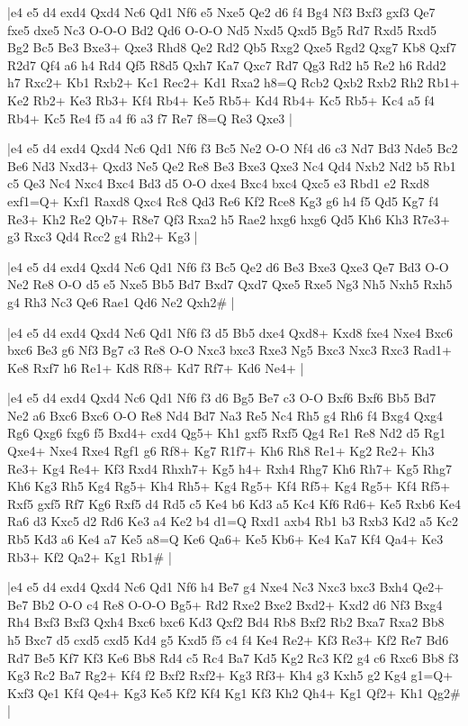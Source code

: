 \whitename{}
\blackname{}
\makegametitle
|e4 e5 d4 exd4 Qxd4 Nc6 Qd1 Nf6 e5 Nxe5 Qe2 d6 f4 Bg4 Nf3 Bxf3 gxf3 Qe7 fxe5 dxe5 Nc3 O-O-O Bd2 Qd6 O-O-O Nd5 Nxd5 Qxd5 Bg5 Rd7 Rxd5 Rxd5 Bg2 Bc5 Be3 Bxe3+ Qxe3 Rhd8 Qe2 Rd2 Qb5 Rxg2 Qxe5 Rgd2 Qxg7 Kb8 Qxf7 R2d7 Qf4 a6 h4 Rd4 Qf5 R8d5 Qxh7 Ka7 Qxc7 Rd7 Qg3 Rd2 h5 Re2 h6 Rdd2 h7 Rxc2+ Kb1 Rxb2+ Kc1 Rec2+ Kd1 Rxa2 h8=Q Rcb2 Qxb2 Rxb2 Rh2 Rb1+ Ke2 Rb2+ Ke3 Rb3+ Kf4 Rb4+ Ke5 Rb5+ Kd4 Rb4+ Kc5 Rb5+ Kc4 a5 f4 Rb4+ Kc5 Re4 f5 a4 f6 a3 f7 Re7 f8=Q Re3 Qxe3  |

\whitename{}
\blackname{}
\makegametitle
|e4 e5 d4 exd4 Qxd4 Nc6 Qd1 Nf6 f3 Bc5 Ne2 O-O Nf4 d6 c3 Nd7 Bd3 Nde5 Bc2 Be6 Nd3 Nxd3+ Qxd3 Ne5 Qe2 Re8 Be3 Bxe3 Qxe3 Nc4 Qd4 Nxb2 Nd2 b5 Rb1 c5 Qe3 Nc4 Nxc4 Bxc4 Bd3 d5 O-O dxe4 Bxc4 bxc4 Qxc5 e3 Rbd1 e2 Rxd8 exf1=Q+ Kxf1 Raxd8 Qxc4 Rc8 Qd3 Re6 Kf2 Rce8 Kg3 g6 h4 f5 Qd5 Kg7 f4 Re3+ Kh2 Re2 Qb7+ R8e7 Qf3 Rxa2 h5 Rae2 hxg6 hxg6 Qd5 Kh6 Kh3 R7e3+ g3 Rxc3 Qd4 Rcc2 g4 Rh2+ Kg3  |

\whitename{}
\blackname{}
\makegametitle
|e4 e5 d4 exd4 Qxd4 Nc6 Qd1 Nf6 f3 Bc5 Qe2 d6 Be3 Bxe3 Qxe3 Qe7 Bd3 O-O Ne2 Re8 O-O d5 e5 Nxe5 Bb5 Bd7 Bxd7 Qxd7 Qxe5 Rxe5 Ng3 Nh5 Nxh5 Rxh5 g4 Rh3 Nc3 Qe6 Rae1 Qd6 Ne2 Qxh2\#  |

\whitename{}
\blackname{}
\makegametitle
|e4 e5 d4 exd4 Qxd4 Nc6 Qd1 Nf6 f3 d5 Bb5 dxe4 Qxd8+ Kxd8 fxe4 Nxe4 Bxc6 bxc6 Be3 g6 Nf3 Bg7 c3 Re8 O-O Nxc3 bxc3 Rxe3 Ng5 Bxc3 Nxc3 Rxc3 Rad1+ Ke8 Rxf7 h6 Re1+ Kd8 Rf8+ Kd7 Rf7+ Kd6 Ne4+  |

\whitename{}
\blackname{}
\makegametitle
|e4 e5 d4 exd4 Qxd4 Nc6 Qd1 Nf6 f3 d6 Bg5 Be7 c3 O-O Bxf6 Bxf6 Bb5 Bd7 Ne2 a6 Bxc6 Bxc6 O-O Re8 Nd4 Bd7 Na3 Re5 Nc4 Rh5 g4 Rh6 f4 Bxg4 Qxg4 Rg6 Qxg6 fxg6 f5 Bxd4+ cxd4 Qg5+ Kh1 gxf5 Rxf5 Qg4 Re1 Re8 Nd2 d5 Rg1 Qxe4+ Nxe4 Rxe4 Rgf1 g6 Rf8+ Kg7 R1f7+ Kh6 Rh8 Re1+ Kg2 Re2+ Kh3 Re3+ Kg4 Re4+ Kf3 Rxd4 Rhxh7+ Kg5 h4+ Rxh4 Rhg7 Kh6 Rh7+ Kg5 Rhg7 Kh6 Kg3 Rh5 Kg4 Rg5+ Kh4 Rh5+ Kg4 Rg5+ Kf4 Rf5+ Kg4 Rg5+ Kf4 Rf5+ Rxf5 gxf5 Rf7 Kg6 Rxf5 d4 Rd5 c5 Ke4 b6 Kd3 a5 Kc4 Kf6 Rd6+ Ke5 Rxb6 Ke4 Ra6 d3 Kxc5 d2 Rd6 Ke3 a4 Ke2 b4 d1=Q Rxd1 axb4 Rb1 b3 Rxb3 Kd2 a5 Kc2 Rb5 Kd3 a6 Ke4 a7 Ke5 a8=Q Ke6 Qa6+ Ke5 Kb6+ Ke4 Ka7 Kf4 Qa4+ Ke3 Rb3+ Kf2 Qa2+ Kg1 Rb1\#  |

\whitename{}
\blackname{}
\makegametitle
|e4 e5 d4 exd4 Qxd4 Nc6 Qd1 Nf6 h4 Be7 g4 Nxe4 Nc3 Nxc3 bxc3 Bxh4 Qe2+ Be7 Bb2 O-O c4 Re8 O-O-O Bg5+ Rd2 Rxe2 Bxe2 Bxd2+ Kxd2 d6 Nf3 Bxg4 Rh4 Bxf3 Bxf3 Qxh4 Bxc6 bxc6 Kd3 Qxf2 Bd4 Rb8 Bxf2 Rb2 Bxa7 Rxa2 Bb8 h5 Bxc7 d5 cxd5 cxd5 Kd4 g5 Kxd5 f5 c4 f4 Ke4 Re2+ Kf3 Re3+ Kf2 Re7 Bd6 Rd7 Be5 Kf7 Kf3 Ke6 Bb8 Rd4 c5 Rc4 Ba7 Kd5 Kg2 Rc3 Kf2 g4 c6 Rxc6 Bb8 f3 Kg3 Rc2 Ba7 Rg2+ Kf4 f2 Bxf2 Rxf2+ Kg3 Rf3+ Kh4 g3 Kxh5 g2 Kg4 g1=Q+ Kxf3 Qe1 Kf4 Qe4+ Kg3 Ke5 Kf2 Kf4 Kg1 Kf3 Kh2 Qh4+ Kg1 Qf2+ Kh1 Qg2\#  |

